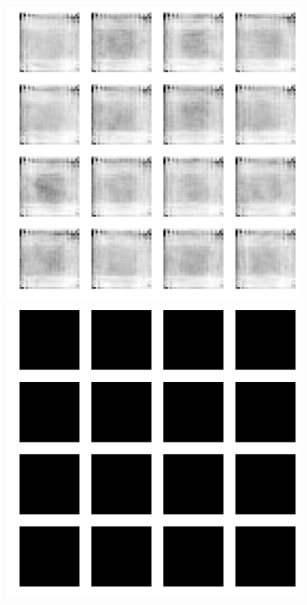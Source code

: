 \documentclass{article}
\begin{document}
\clearpage
{}
\begin{figure}[ht]
\label{fig:gan-samples-solidcolor}
\centering
\includegraphics[height=330px]{gan-sample-fake-solidcolor.png}
\caption{}
\includegraphics[height=330px]{gan-sample-real-solidcolor.png}
\end{figure}
\end{document}
